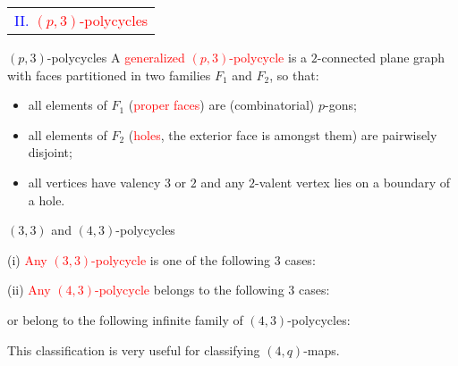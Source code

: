 \documentclass[%
pdf,
colorBG,
slideColor,
]{prosper}
\begin{document}
\begin{slide}{}
\begin{center}
{\Huge 
\begin{tabular*}{7cm}{c}
\\[-0.5cm]
\textcolor{blue}{II. }\textcolor{red}{$(p,3)$-polycycles}
\end{tabular*}
}
\end{center}
\end{slide}




\begin{slide}{$(p,3)$-polycycles}
A \textcolor{red}{generalized $(p,3)$-polycycle} is a 
$2$-connected plane graph with faces partitioned
in two families $F_1$ and $F_2$, so that:
\begin{itemize}
\item all elements of $F_1$ (\textcolor{red}{proper faces}) are
(combinatorial) $p$-gons;
\item all elements of $F_2$ (\textcolor{red}{holes}, the exterior face
is amongst them) are pairwisely disjoint;
\item all vertices have valency $3$ or $2$ and any $2$-valent vertex lies on a 
boundary of a hole.
\end{itemize}

\begin{center}
\end{center}

\end{slide}





\begin{slide}{$(3,3)$ and $(4,3)$-polycycles}
{\it\scriptsize


(i) \textcolor{red}{Any $(3,3)$-polycycle} is one of the following $3$ cases:
\begin{center}
\end{center}

(ii) \textcolor{red}{Any $(4,3)$-polycycle} belongs to the following $3$ cases:
\begin{center}
\end{center}
\hspace{1cm}or belong to the following infinite family of $(4,3)$-polycycles:
\begin{center}
\end{center}

}
This classification is very useful for classifying $(4,q)$-maps.

\end{slide}
\end{document}
